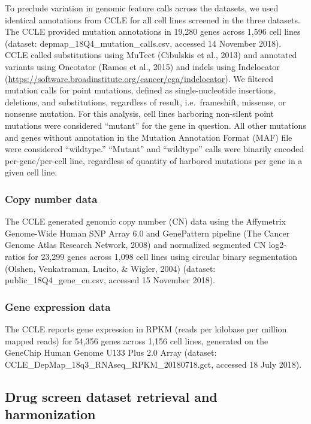 \documentclass[man,floatsintext]{apa6}
\begin{document}
To preclude variation in genomic feature calls across the datasets, we
used identical annotations from CCLE for all cell lines screened in the
three datasets. The CCLE provided mutation annotations in 19,280 genes
across 1,596 cell lines (dataset: depmap\_18Q4\_mutation\_calls.csv,
accessed 14 November 2018). CCLE called substitutions using MuTect
(Cibulskis et al., 2013) and annotated variants using Oncotator (Ramos
et al., 2015) and indels using Indelocator
(\url{https://software.broadinstitute.org/cancer/cga/indelocator}). We
filtered mutation calls for point mutations, defined as
single-nucleotide insertions, deletions, and substitutions, regardless
of result, i.e.~frameshift, missense, or nonsense mutation. For this
analysis, cell lines harboring non-silent point mutations were
considered \enquote{mutant} for the gene in question. All other
mutations and genes without annotation in the Mutation Annotation Format
(MAF) file were considered \enquote{wildtype.} \enquote{Mutant} and
\enquote{wildtype} calls were binarily encoded per-gene/per-cell line,
regardless of quantity of harbored mutations per gene in a given cell
line.

\subsubsection{Copy number data}\label{copy-number-data}

The CCLE generated genomic copy number (CN) data using the Affymetrix
Genome-Wide Human SNP Array 6.0 and GenePattern pipeline (The Cancer
Genome Atlas Research Network, 2008) and normalized segmented CN
log2-ratios for 23,299 genes across 1,098 cell lines using circular
binary segmentation (Olshen, Venkatraman, Lucito, \& Wigler, 2004)
(dataset: public\_18Q4\_gene\_cn.csv, accessed 15 November 2018).

\subsubsection{Gene expression data}\label{gene-expression-data}

The CCLE reports gene expression in RPKM (reads per kilobase per million
mapped reads) for 54,356 genes across 1,156 cell lines, generated on the
GeneChip Human Genome U133 Plus 2.0 Array (dataset:
CCLE\_DepMap\_18q3\_RNAseq\_RPKM\_20180718.gct, accessed 18 July 2018).

\subsection{Drug screen dataset retrieval and
harmonization}\label{drug-screen-dataset-retrieval-and-harmonization}
\end{document}
